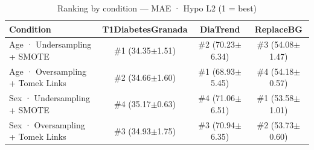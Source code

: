\begin{table}[htbp]
\centering
\small
\caption{Ranking by condition — MAE · Hypo L2  (1 = best)}
\label{tab:ranking_mae_tbr_2_family_mechanism_random+guided}
\begin{tabular}{lccc}
\toprule
\textbf{Condition} & \textbf{T1DiabetesGranada} & \textbf{DiaTrend} & \textbf{ReplaceBG} \\
\midrule
Age · Undersampling + SMOTE & \#1 (34.35$\pm$1.51) & \#2 (70.23$\pm$6.34) & \#3 (54.08$\pm$1.47) \\
Age · Oversampling + Tomek Links & \#2 (34.66$\pm$1.60) & \#1 (68.93$\pm$5.45) & \#4 (54.18$\pm$0.57) \\
\midrule
Sex · Undersampling + SMOTE & \#4 (35.17$\pm$0.63) & \#4 (71.06$\pm$6.51) & \#1 (53.58$\pm$1.01) \\
Sex · Oversampling + Tomek Links & \#3 (34.93$\pm$1.75) & \#3 (70.94$\pm$6.35) & \#2 (53.73$\pm$0.60) \\
\bottomrule
\end{tabular}
\end{table}